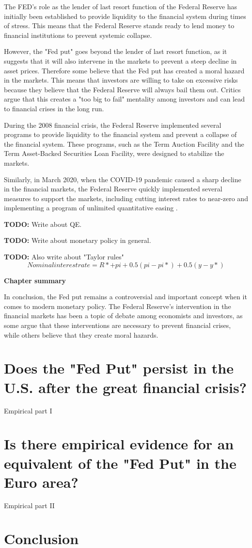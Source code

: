 The FED's role as the lender of last resort function of the Federal Reserve has initially been established to provide liquidity to the financial system during times of stress.  \parencite{Holland91}
This means that the Federal Reserve stands ready to lend money to financial institutions to prevent systemic collapse. 

However, the "Fed put" goes beyond the lender of last resort function,  as it suggests that it will also intervene in the markets to prevent a steep decline in asset prices.
Therefore some believe that the Fed put has created a moral hazard in the markets.  \parencite{WSJ7} 
This means that investors are willing to take on excessive risks because they believe that the Federal Reserve will always bail them out.  
Critics argue that this creates a "too big to fail" mentality among investors and can lead to financial crises in the long run. 

During the 2008 financial crisis,  the Federal Reserve implemented several programs to provide liquidity to the financial system and prevent a collapse of the financial system. 
These programs,  such as the Term Auction Facility and the Term Asset-Backed Securities Loan Facility,  were designed to stabilize the markets.  

Similarly,  in March 2020, when the COVID-19 pandemic caused a sharp decline in the financial markets,  the Federal Reserve quickly implemented several measures to support the markets,  including cutting interest rates to near-zero and implementing a program of unlimited quantitative easing \parencite{FED21}.

\textbf{TODO:} Write about QE.

\textbf{TODO:} Write about monetary policy in general.

\textbf{TODO:} Also write about "Taylor rules"
\[ Nominal interest rate = R* + pi + 0.5(pi - pi*) + 0.5(y - y*) \]

\textbf{Chapter summary}

In conclusion,  the Fed put remains a controversial and important concept when it comes to modern monetary policy.  
The Federal Reserve's intervention in the financial markets has been a topic of debate among economists and investors,  as some argue that these interventions are necessary to prevent financial crises,  while others believe that they create moral hazards. 

\chapter{Does the "Fed Put" persist in the U.S.  after the great financial crisis?}

Empirical part I

\chapter{Is there empirical evidence for an equivalent of the "Fed Put" in the Euro area?}

Empirical part II

\chapter{Conclusion}


